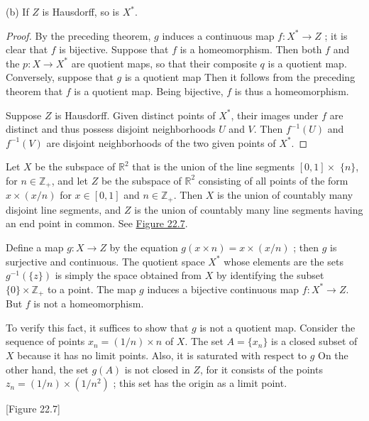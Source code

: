 (b) If \(Z\) is Hausdorff, so is \(X^{ * }\).

\begin{proof}
 By the preceding theorem, \(g\) induces a continuous map \(f : X^{ * } \rightarrow Z\) ; it is clear that \(f\) is bijective. Suppose that \(f\) is a homeomorphism. Then both \(f\) and the  \(p : X \rightarrow {X}^{ * }\) are quotient maps, so that their composite \(q\) is a quotient map. Conversely, suppose that \(g\) is a quotient map Then it follows from the preceding theorem that \(f\) is a quotient map. Being bijective, \(f\) is thus a homeomorphism.

 Suppose \(Z\) is Hausdorff. Given distinct points of \(X^{ * }\), their images under \(f\) are distinct and thus possess disjoint neighborhoods \(U\) and \(V\). Then \(f^{-1}( U)\) and \(f^{-1}( V)\) are disjoint neighborhoods of the two given points of \(X^{ * }\).
\end{proof}

\begin{centeredblock*}
\begin{example}
\label{ex:\thesection.\theexample}
 Let \(X\) be the subspace of \(\mathbb{R}^{2}\) that is the union of the line segments \([ {0,1}] \times\) \(\{ n\}\), for \(n \in {\mathbb{Z}}_{ + }\), and let \(Z\) be the subspace of \(\mathbb{R}^{2}\) consisting of all points of the form \(x \times ( {x/n})\) for \(x \in [ {0,1}]\) and \(n \in {\mathbb{Z}}_{ + }\). Then \(X\) is the union of countably many disjoint line segments, and \(Z\) is the union of countably many line segments having an end point in common. See \hyperref[fig:22.7]{Figure 22.7}.

Define a map \(g : X \rightarrow Z\) by the equation \(g( {x \times n}) = x \times ( {x/n})\) ; then \(g\) is surjective and continuous. The quotient space \(X^{ * }\) whose elements are the sets \(g^{-1}( {\{ z\} })\) is simply the space obtained from \(X\) by identifying the subset \(\{ 0\} \times {\mathbb{Z}}_{ + }\) to a point. The map \(g\) induces a bijective continuous map \(f : X^{ * } \rightarrow Z\). But \(f\) is not a homeomorphism.

To verify this fact, it suffices to show that \(g\) is not a quotient map. Consider the sequence of points \(x_{n} = ( {1/n}) \times n\) of \(X\). The set \(A = \{ x_{n}\}\) is a closed subset of \(X\) because it has no limit points. Also, it is saturated with respect to \(g\) On the other hand, the set \(g( A)\) is not closed in \(Z\), for it consists of the points \(z_{n} = ( {1/n}) \times ( {1/n^{2}})\) ; this set has the origin as a limit point.

[Figure 22.7]
\end{example}
\end{centeredblock*}

